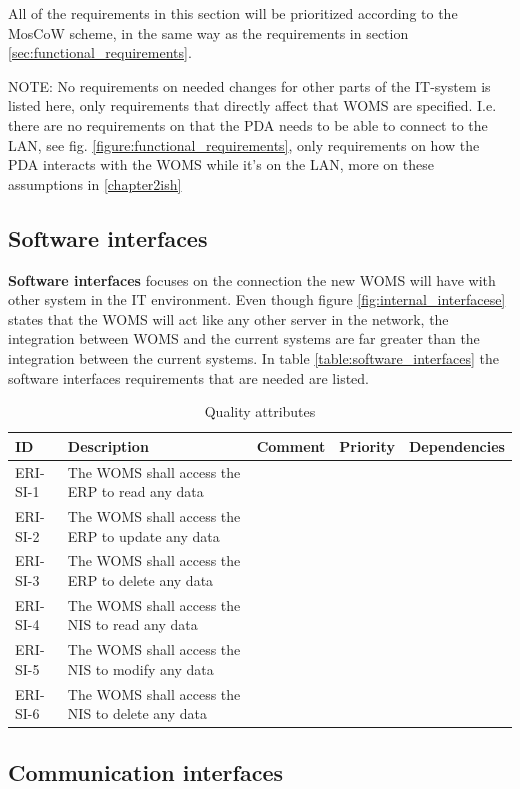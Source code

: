 All of the requirements in this section will be prioritized according to the MosCoW scheme, in the same way as the requirements in section \ref{sec:functional_requirements}.	

NOTE: No requirements on needed changes for other parts of the IT-system is listed here, only requirements that directly affect that WOMS are specified. I.e. there are no requirements on that the PDA needs to be able to connect to the LAN, see fig. \ref{figure:functional_requirements}, only requirements on how the PDA interacts with the WOMS while it’s on the LAN, more on these assumptions in \ref{chapter2ish} 

\subsection{Software interfaces}
\label{sub:software_interfaces}

\textbf{Software interfaces} focuses on the connection the new WOMS will have with other system in the IT environment. Even though figure \ref{fig:internal_interfacese} states that the WOMS will act like any other server in the network, the integration between WOMS and the current systems are far greater than the integration between the current systems.  In table \ref{table:software_interfaces} the software interfaces requirements that are needed are listed.

\begin{table}
\label{table:4_1_requirements}
\centering
\begin{tabular}{|l|p{2cm}|p{2cm}|l|l|}
\hline
ID 		& Description & Comment & Priority & Dependencies \\
\hline
ERI-SI-1& The WOMS shall access the ERP to read any data & & & \\
ERI-SI-2& The WOMS shall access the ERP to update any data & & & \\
ERI-SI-3& The WOMS shall access the ERP to delete any data & & & \\
ERI-SI-4& The WOMS shall access the NIS to read any data & & & \\
ERI-SI-5& The WOMS shall access the NIS  to modify any data & & & \\
ERI-SI-6& The WOMS shall access the NIS  to delete any data & & & \\
\hline
\end{tabular}
\caption{Quality attributes}
\end{table}

\subsection{Communication interfaces}
\label{sub:communication_interfaces}

